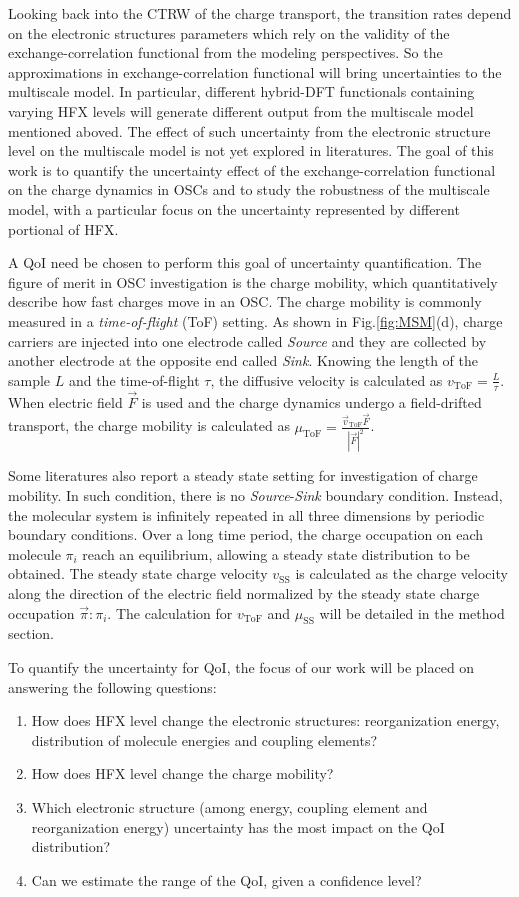 \documentclass[%
 reprint,
 amsmath,amssymb,
 aps,
]{revtex4-2}
\begin{document}
Looking back into the CTRW of the charge transport, the transition rates depend on the electronic structures parameters which rely on the validity of the exchange-correlation functional from the modeling perspectives.
So the approximations in exchange-correlation functional will bring uncertainties to the multiscale model. 
In particular, different hybrid-DFT functionals containing varying HFX levels will generate different output from the multiscale model mentioned aboved. 
The effect of such uncertainty from the electronic structure level on the multiscale model is not yet explored in literatures. 
The goal of this work is to quantify the uncertainty effect of the exchange-correlation functional on the charge dynamics in OSCs and to study the robustness of the multiscale model, with a particular focus on the uncertainty represented by different portional of HFX.

A QoI need be chosen to perform this goal of uncertainty quantification. 
The figure of merit in OSC investigation is the charge mobility, which quantitatively describe how fast charges move in an OSC. 
The charge mobility is commonly measured in a \textit{time-of-flight} (ToF) setting. 
As shown in Fig.\ref{fig:MSM}(d), charge carriers are injected into one electrode called \textit{Source} and they are collected by another electrode at the opposite end called \textit{Sink}. 
Knowing the length of the sample $L$ and the time-of-flight $\tau$, the diffusive velocity is calculated as $v_\text{ToF}=\frac{L}{\tau}$.
When electric field $\vec{F}$ is used and the charge dynamics undergo a field-drifted transport, the charge mobility is calculated as $\mu_\text{ToF}=\frac{\vec{v}_\text{ToF} \vec{F}}{|\vec{F}|^2}$. 

Some literatures also report a steady state setting for investigation of charge mobility. In such condition, there is no \textit{Source}-\textit{Sink} boundary condition. Instead, the molecular system is infinitely repeated in all three dimensions by periodic boundary conditions. 
Over a long time period, the charge occupation on each molecule $\pi_i$ reach an equilibrium, allowing a steady state distribution to be obtained.
The steady state charge velocity $v_\text{SS}$ is calculated as the charge velocity along the direction of the electric field normalized by the steady state charge occupation $\vec{\pi}:\pi_i$. 
The calculation for $v_\text{ToF}$ and $\mu_\text{SS}$ will be detailed in the method section.

To quantify the uncertainty for QoI, the focus of our work will be placed on answering the following questions: 
\begin{enumerate}
    \item How does HFX level change the electronic structures: reorganization energy, distribution of molecule energies and coupling elements? 
    \item How does HFX level change the charge mobility?
    \item Which electronic structure (among energy, coupling element and reorganization energy) uncertainty has the most impact on the QoI distribution?
    \item Can we estimate the range of the QoI, given a confidence level?
\end{enumerate}
\end{document}
